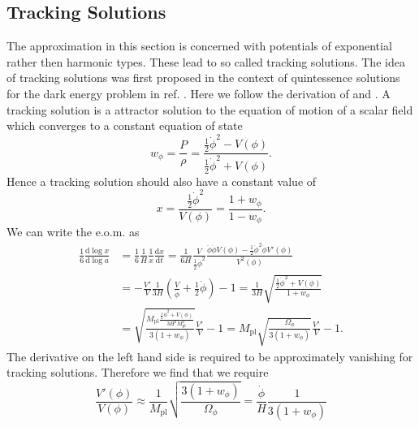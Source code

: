 \documentclass[master,       %
               twoside,        %
               BCOR10mm,       %
               english,ngerman, %
               ]{GAUBM}
\begin{document}
\begin{otherlanguage}{english}
\subsection{Tracking Solutions}
The approximation in this section is concerned with potentials of exponential rather then harmonic types. These lead to so called tracking solutions.
The idea of tracking solutions was first proposed in the context of quintessence solutions for the dark energy problem in ref. \cite{tracking_solutions_Steinhardt:1999nw}.
Here we follow the derivation of \cite[appendix A]{Deformed_potential_Bae_2019} and \cite{tracking_solutions_Steinhardt:1999nw}.
A tracking solution is a attractor solution to the equation of motion of a scalar field which converges to a constant equation of state
\begin{equation}
	w_\phi = \frac{P}{\rho} = \frac{\frac{1}{2} \dot{\phi}^2 - V(\phi)}{\frac{1}{2} \dot{\phi}^2 + V(\phi)}.
\end{equation}
Hence a tracking solution should also have a constant value of
\begin{equation}
	x = \frac{\frac{1}{2} \dot{\phi}^2}{V(\phi)} = \frac{1 + w_\phi}{1 - w_\phi}.
\end{equation}
We can write the e.o.m. as
\begin{align}
	\label{eq:tracking_eom}
	\frac{1}{6} \frac{\mathrm{d} \log x}{\mathrm{d} \log a}
	&= \frac{1}{6} \frac{1}{H} \frac{1}{x} \frac{\mathrm{d} x}{\mathrm{d} t}
	= \frac{1}{6 H} \frac{V}{\frac{1}{2} \dot{\phi}^2} \frac{\ddot{\phi} \dot{\phi} V(\phi) - \frac{1}{2} \dot{\phi}^2 \dot{\phi} V'(\phi)}{V^2(\phi)} \nonumber \\
	&= - \frac{V'}{V} \frac{1}{3 H} \left( \frac{V}{\dot{\phi}} + \frac{1}{2} \dot{\phi} \right) - 1
	= \frac{1}{3 H} \sqrt{ \frac{ \frac{1}{2} \dot{\phi}^2 + V(\phi) }{1 + w_\phi}} \nonumber \\
	&= \sqrt{ \frac{ M_\mathrm{pl} \frac{ \frac{1}{2} \dot{\phi}^2 + V(\phi) } {3 H^2 M_\mathrm{pl}^2} }{3(1 + w_\phi)}} \frac{V'}{V} - 1
	= M_\mathrm{pl} \sqrt{ \frac{\Omega_\phi}{3(1 + w_\phi)}} \frac{V'}{V} - 1.
\end{align}
The derivative on the left hand side is required to be approximately vanishing for tracking solutions. Therefore we find that we require
\begin{equation}
	\label{eq:const_x}
	\frac{V'(\phi)}{V(\phi)} \approx \frac{1}{M_\mathrm{pl}} \sqrt{\frac{3(1 + w_\phi)}{\Omega_\phi}} = \frac{\dot{\phi}}{H} \frac{1}{3(1 + w_\phi)}
\end{equation}

\end{otherlanguage}
\end{document}

